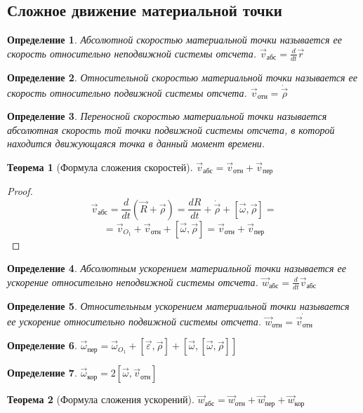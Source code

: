 \documentclass{article}
\renewcommand{\v}[1]{{\vec{#1}}}
\newtheorem*{df}{Определение}
\newtheorem{teo}{Теорема}
\begin{document}
  \subsection{Сложное движение материальной точки}
  \begin{df}
  Абсолютной скоростью материальной точки называется ее скорость относительно неподвижной системы отсчета. $\v{v}_{\text{абс}} = \frac{d}{dt}\v{r}$
  \end{df}
  \begin{df}
  Относительной скоростью материальной точки называется ее скорость относительно подвижной системы отсчета. $\v{v}_{\text{отн}} = \dot{\v{\rho}}$
  \end{df}
  \begin{df}
  Переносной скоростью материальной точки называется абсолютная скорость той точки подвижной системы отсчета, в которой находится движующаяся точка в данный момент времени.
  \end{df}
  \begin{teo}
  [Формула сложения скоростей] $\v{v}_{\text{абс}} = \v{v}_{\text{отн}} + \v{v}_{\text{пер}}$
  \end{teo}
  \begin{proof}
  $$ \v{v}_{\text{абс}} = \frac{d}{dt}(\v{R} + \v{\rho}) = \frac{dR}{dt} + \dot{\v{\rho}} + [\v{\omega}, \v{\rho}] = $$
  $$ = \v{v}_{O_1} + \v{v}_{\text{отн}} + [\v{\omega}, \v{\rho}] = \v{v}_{\text{отн}} + \v{v}_{\text{пер}} $$
  \end{proof}
  \begin{df}
  Абсолютным ускорением материальной точки называется ее ускорение относительно неподвижной системы отсчета. $\v{w}_{\text{абс}} = \frac{d}{dt}\v{v}_{\text{абс}}$
  \end{df}
  \begin{df}
  Относительным ускорением материальной точки называется ее ускорение относительно подвижной системы отсчета. $\v{w}_{\text{отн}} = \dot{\v{v}_{\text{отн}}}$
  \end{df}
  \begin{df}
  $ \vec{\omega}_{\text{пер}} = \vec{\omega}_{O_1} + [\vec{\varepsilon}, \vec{\rho}] + [\vec{\omega}, [\vec{\omega}, \vec{\rho}]] $
  \end{df}
  \begin{df}
  $ \vec{\omega}_{\text{кор}} = 2[\vec{\omega}, \vec{v}_\text{отн}] $
  \end{df}
  \begin{teo}
  [Формула сложения ускорений] $\v{w}_{\text{абс}} = \v{w}_{\text{отн}} + \v{w}_{\text{пер}} + \v{w}_{\text{кор}}$
  \end{teo}
\end{document}
